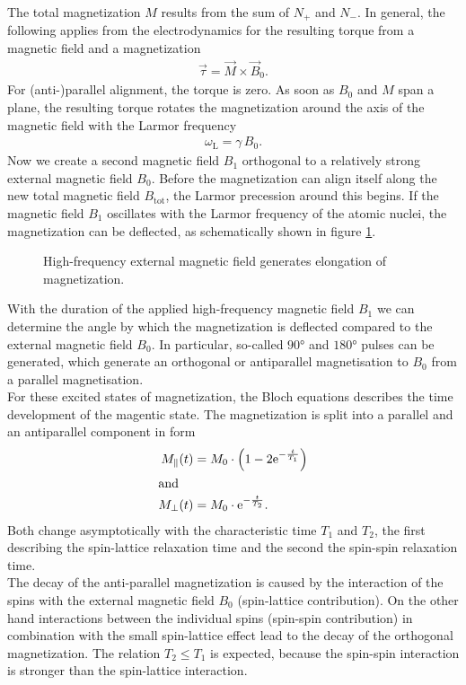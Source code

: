 The total magnetization $M$ results from the sum of $N_+$ and $N_-$.
In general, the following applies from the electrodynamics for the resulting torque from a magnetic field and a magnetization
\begin{align}
\vec{\tau}=\vec{M}\times\vec{B}_0.
\end{align}
For (anti-)parallel alignment, the torque is zero.
As soon as $B_0$ and $M$ span a plane, the resulting torque rotates the magnetization around the axis of the magnetic field with the Larmor frequency
\begin{align}
\omega_\text{L}=\gamma\,B_0.
\label{eq:lamor}
\end{align}
Now we create a second magnetic field $B_1$ orthogonal to a relatively strong external magnetic field $B_0$.
Before the magnetization can align itself along the new total magnetic field $B_\text{tot}$, the Larmor precession around this begins.
If the magnetic field $B_1$ oscillates with the Larmor frequency of the atomic nuclei, the magnetization can be deflected, as schematically shown in figure \ref{fig:magnet}.
\begin{figure}[ht]
\centering

\caption{High-frequency external magnetic field generates elongation of magnetization.}
\label{fig:magnet}
\end{figure}
With the duration of the applied high-frequency magnetic field $B_1$ we can determine the angle by which the magnetization is deflected compared to the external magnetic field $B_0$.
In particular, so-called $\ang{90}$ and $\ang{180}$ pulses can be generated, which generate an orthogonal or antiparallel magnetisation to $B_0$ from a parallel magnetisation.\\

For these excited states of magnetization, the Bloch equations describes the time development of the magentic state.
The magnetization is split into a parallel and an antiparallel component in form
\begin{align}
M_\parallel(t)&=M_0\cdot\left(1-2\mathrm{e}^{-\frac{t}{T_1}}\right) \label{eq:t1}\\
\intertext{and}
M_\bot(t)&=M_0\cdot\mathrm{e}^{-\frac{t}{T_2}}.
\label{eq:t2}
\end{align}
Both change asymptotically with the characteristic time $T_1$ and $T_2$, the first describing the spin-lattice relaxation time and the second the spin-spin relaxation time.\\
The decay of the anti-parallel magnetization is caused by the interaction of the spins with the external magnetic field $B_0$ (spin-lattice contribution).
On the other hand interactions between the individual spins (spin-spin contribution) in combination with the small spin-lattice effect lead to the decay of the orthogonal magnetization.
The relation $T_2\leq T_1$ is expected, because the spin-spin interaction is stronger than the spin-lattice interaction.\\

